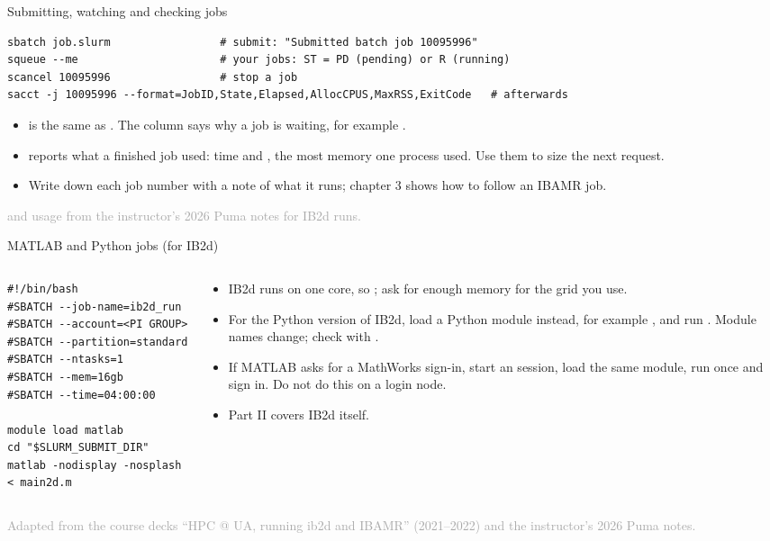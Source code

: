 \documentclass[aspectratio=169,11pt]{beamer}
\newcommand{\sourcecredit}[1]{\vfill\hfill{\tiny\textcolor{DarkGray}{#1}}}
\begin{document}
\begin{frame}[fragile]{Submitting, watching and checking jobs}
\begin{lstlisting}[style=shell]
sbatch job.slurm                 # submit: "Submitted batch job 10095996"
squeue --me                      # your jobs: ST = PD (pending) or R (running)
scancel 10095996                 # stop a job
sacct -j 10095996 --format=JobID,State,Elapsed,AllocCPUS,MaxRSS,ExitCode   # afterwards
\end{lstlisting}
\begin{itemize}\small
  \item {} is the same as . The  column says why a job is waiting, for example .
  \item {} reports what a finished job used:  time and , the most memory one process used. Use them to size the next request.
  \item Write down each job number with a note of what it runs; chapter 3 shows how to follow an IBAMR job.
\end{itemize}
\sourcecredit{ and  usage from the instructor's 2026 Puma notes for IB2d runs.}
\end{frame}

\begin{frame}[fragile]{MATLAB and Python jobs (for IB2d)}
\begin{columns}[T,onlytextwidth]
\begin{column}{0.52\textwidth}
\begin{lstlisting}[style=slurm]
#!/bin/bash
#SBATCH --job-name=ib2d_run
#SBATCH --account=<PI GROUP>
#SBATCH --partition=standard
#SBATCH --ntasks=1
#SBATCH --mem=16gb
#SBATCH --time=04:00:00

module load matlab
cd "$SLURM_SUBMIT_DIR"
matlab -nodisplay -nosplash < main2d.m
\end{lstlisting}
\end{column}
\begin{column}{0.45\textwidth}
\begin{itemize}\scriptsize
  \item IB2d runs on one core, so ; ask for enough memory for the grid you use.
  \item For the Python version of IB2d, load a Python module instead, for example , and run . Module names change; check with .
  \item If MATLAB asks for a MathWorks sign-in, start an  session, load the same module, run  once and sign in. Do not do this on a login node.
  \item Part II covers IB2d itself.
\end{itemize}
\end{column}
\end{columns}
\sourcecredit{Adapted from the course decks ``HPC @ UA, running ib2d and IBAMR'' (2021--2022) and the instructor's 2026 Puma notes.}
\end{frame}
\end{document}
